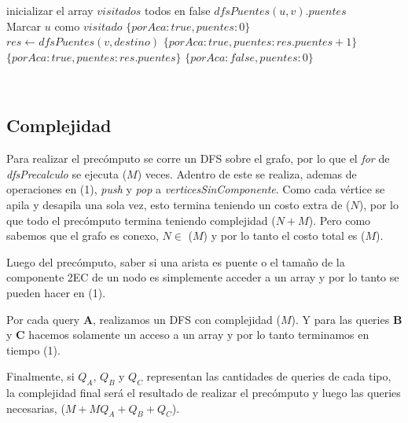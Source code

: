 \begin{algorithmic}

    \State inicializar el array $visitados$ todos en false
    \State \Return $dfsPuentes(u,v).puentes$
\EndFunction
\\

    \State Marcar $u$ como $visitado$
        \State \Return $\{porAca: true, puentes: 0\}$
    \EndIf
        \State $res \gets dfsPuentes(v, destino)$
                \State \Return $\{porAca: true, puentes: res.puentes + 1\}$
            \Else
                \State \Return $\{porAca: true, puentes: res.puentes\}$
            \EndIf
        \EndIf
    \EndFor
    \State \Return $\{porAca: false, puentes: 0\}$
\EndFunction
\\

\end{algorithmic}

\begin{algorithmic}

    \State {}
\EndFunction
\\

\end{algorithmic}

\begin{algorithmic}

    \State {}
\EndFunction

\end{algorithmic}

\subsection{Complejidad}

Para realizar el precómputo se corre un DFS sobre el grafo, por lo que el \textit{for} de \textit{dfsPrecalculo} se ejecuta \bigo($M$) veces. Adentro de este se realiza, ademas de operaciones en \bigo(1), \textit{push} y \textit{pop} a \textit{verticesSinComponente}. Como cada vértice se apila y desapila una sola vez, esto termina teniendo un costo extra de \bigo($N$), por lo que todo el precómputo termina teniendo complejidad \bigo($N+M$). Pero como sabemos que el grafo es conexo, $N \in$ \bigo($M$) y por lo tanto el costo total es \bigo($M$).

Luego del precómputo, saber si una arista es puente o el tamaño de la componente 2EC de un nodo es simplemente acceder a un array y por lo tanto se pueden hacer en \bigo(1).

Por cada query \textbf{A}, realizamos un DFS con complejidad \bigo($M$). Y para las queries \textbf{B} y \textbf{C} hacemos solamente un acceso a un array y por lo tanto terminamos en tiempo \bigo(1).

Finalmente, si $Q_A$, $Q_B$ y $Q_C$ representan las cantidades de queries de cada tipo, la complejidad final será el resultado de realizar el precómputo y luego las queries necesarias, \bigo($M + M Q_A + Q_B + Q_C$).
